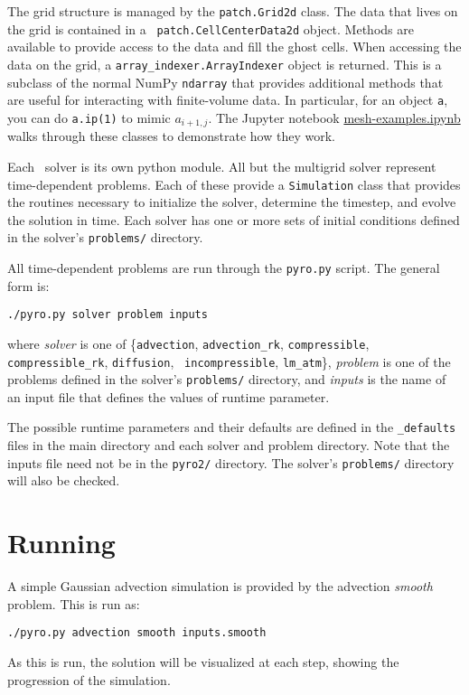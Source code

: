The grid structure is managed by the {\tt patch.Grid2d} class. The data
that lives on the grid is contained in a {\tt
  patch.CellCenterData2d} object.  Methods are available to provide
access to the data and fill the ghost cells.  When accessing the data
on the grid, a {\tt array\_indexer.ArrayIndexer} object is returned.
This is a subclass of the normal NumPy {\tt ndarray} that provides
additional methods that are useful for interacting with finite-volume
data.  In particular, for an object {\tt a}, you can do {\tt a.ip(1)}
to mimic $a_{i+1,j}$.  The Jupyter notebook
\href{https://github.com/python-hydro/pyro2/blob/master/mesh/mesh-examples.ipynb}{mesh-examples.ipynb}
walks through these classes to demonstrate how they work.

Each \pyro\ solver is its own python module.  All but the multigrid
solver represent time-dependent problems.  Each of these provide a
{\tt Simulation} class that provides the routines necessary to
initialize the solver, determine the timestep, and evolve the solution
in time.  Each solver has one or more sets of initial conditions
defined in the solver's {\tt problems/} directory.

All time-dependent problems are run through the {\tt pyro.py} script.
The general form is:
\begin{verbatim}
./pyro.py solver problem inputs
\end{verbatim}
 where {\em solver} is one of \{{\tt advection}, {\tt advection\_rk},
 {\tt compressible}, {\tt compressible\_rk}, {\tt diffusion}, {\tt
   incompressible}, {\tt lm\_atm}\}, {\em problem} is one of the
 problems defined in the solver's {\tt problems/} directory, and {\em
   inputs} is the name of an input file that defines the values of
 runtime parameter.

The possible runtime parameters and their defaults are defined in the
{\tt \_defaults} files in the main directory and each solver and
problem directory.  Note that the inputs file need not be in the 
{\tt pyro2/} directory.  The solver's {\tt problems/} directory
will also be checked.

\section{Running \pyro}

A simple Gaussian advection simulation is provided by the advection
{\em smooth} problem.  This is run as:
\begin{verbatim}
./pyro.py advection smooth inputs.smooth
\end{verbatim}
As this is run, the solution will be visualized at each step,
showing the progression of the simulation.  


